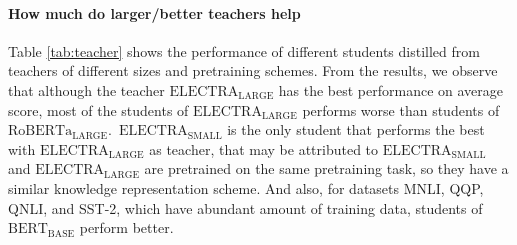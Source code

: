 \documentclass[11pt]{article}
\begin{document}
\paragraph{How much do larger/better teachers help}
Table \ref{tab:teacher} shows the performance of different students distilled from teachers of different sizes and pretraining schemes. From the results, we observe that although the teacher $\text{ELECTRA}_{\text{LARGE}}$ has the best performance on average score, most of the students of $\text{ELECTRA}_{\text{LARGE}}$ performs worse than students of $\text{RoBERTa}_{\text{LARGE}}$.~$\text{ELECTRA}_{\text{SMALL}}$ is the only student that performs the best with $\text{ELECTRA}_{\text{LARGE}}$ as teacher, that may be attributed to $\text{ELECTRA}_{\text{SMALL}}$ and $\text{ELECTRA}_{\text{LARGE}}$ are pretrained on the same pretraining task, so they have a similar knowledge representation scheme. And also, for datasets MNLI, QQP, QNLI, and SST-2, which have 
abundant amount of training data, students of $\text{BERT}_{\text{BASE}}$ perform better. 
\end{document}
